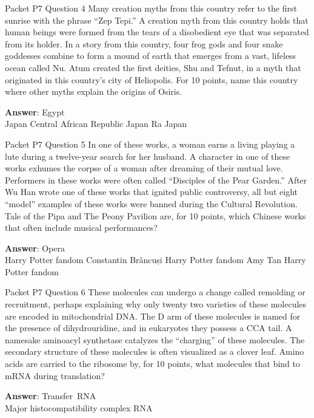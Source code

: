 \begin{frame}{Packet P7 Question 4}
Many creation myths from this country refer to the first sunrise with the phrase “Zep Tepi.” A creation myth from this country holds that human beings were formed from the tears of a disobedient eye that was separated from its holder. In a story from this country, four frog gods and   four snake goddesses combine to form a mound of earth that emerges from a vast, lifeless ocean called Nu. Atum created the first deities, Shu and Tefnut, in a myth that originated in this country’s city of Heliopolis. For 10 points, name this country where other myths explain the origins of Osiris.        

\textbf{Answer}: Egypt\\
 Japan
 Central African Republic
 Japan
 Ra
 Japan
\end{frame}

\begin{frame}{Packet P7 Question 5}
In one of these works, a woman earns a living playing a lute during a twelve-year search for her husband. A character in one of these works exhumes the corpse of a woman after dreaming of their mutual love. Performers in these works were often called “Disciples of the Pear Garden.” After Wu Han wrote one of these works that ignited public controversy, all but eight “model” examples of these works were banned during the Cultural Revolution. Tale of the Pipa and The Peony Pavilion   are, for 10 points, which Chinese works that often include musical performances?        

\textbf{Answer}: Opera\\
 Harry Potter fandom
 Constantin Brâncuși
 Harry Potter fandom
 Amy Tan
 Harry Potter fandom
\end{frame}

\begin{frame}{Packet P7 Question 6}
These molecules can undergo   a change called remolding or recruitment,   perhaps explaining why only twenty two varieties of these molecules are encoded in mitochondrial DNA. The D arm of these molecules is named for the presence of dihydrouridine, and in eukaryotes   they possess a CCA tail. A namesake aminoacyl synthetase catalyzes   the “charging” of these molecules. The secondary structure of these molecules is often visualized as a clover leaf. Amino acids are carried to the ribosome by, for 10 points, what molecules that   bind to mRNA during   translation?

\textbf{Answer}: Transfer\ RNA\\
 Major histocompatibility complex
 RNA
\end{frame}

